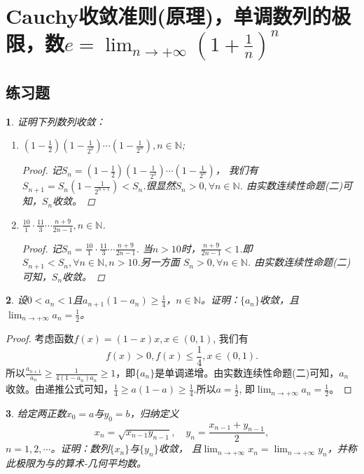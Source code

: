 \documentclass[utf8]{book}
\newtheorem{example}{}[section]             %
\begin{document}
\section{Cauchy收敛准则(原理)，单调数列的极限，数$e=\displaystyle \lim_{n\to +\infty}\left(1+\frac{1}{n}\right)^n$}
\subsection{练习题}
\begin{example}
证明下列数列收敛：
\renewcommand\labelenumi{\normalfont(\theenumi)}
\begin{enumerate}
\item $\displaystyle\left(1-\frac{1}{2}\right)\left(1-\frac{1}{2^2}\right)\cdots\left(1-\frac{1}{2^n}\right), n\in\mathbb{N}$;
\begin{proof}
记$S_n = \left(1-\frac{1}{2}\right)\left(1-\frac{1}{2^2}\right)\cdots\left(1-\frac{1}{2^n}\right)$， 我们有$S_{n+1} = S_n\left(1-\frac{1}{2^{n+1}}\right) < 
S_n$.很显然$S_n > 0,\forall n\in\mathbb{N}$. 由实数连续性命题(二)可知，$S_n$收敛。
\end{proof}

\item $\displaystyle\frac{10}{1}\cdot\frac{11}{3}\cdots\frac{n+9}{2n-1}, n\in\mathbb{N}$.
\begin{proof}
记$S_n = \displaystyle\frac{10}{1}\cdot\frac{11}{3}\cdots\frac{n+9}{2n-1}$. 当$n>10$时，$\frac{n+9}{2n-1} < 1$.即$S_{n+1} < S_{n},\forall n \in \mathbb{N}, n > 10$.另一方面
$S_n > 0, \forall n\in\mathbb{N}$. 由实数连续性命题(二)可知，$S_n$收敛。
\end{proof}
\end{enumerate}
\end{example}
\begin{example}
设$0<a_n<1$且$a_{n+1}(1-a_n)\geq \frac{1}{4}$，$n\in\mathbb{N}$。证明：$\{a_n\}$收敛，且$\displaystyle \lim_{n\to +\infty}a_n = \frac{1}{2}$。
\end{example}
\begin{proof}
考虑函数$f(x) = (1-x)x, x\in (0,1)$, 我们有$$f(x) > 0, f(x) \leq \frac{1}{4}, x\in (0,1).$$
所以$\displaystyle\frac{a_{n+1}}{a_n} \geq \frac{1}{4(1-a_n)a_n} \geq 1$，即$\{a_n\}$是单调递增。由实数连续性命题(二)可知，$a_n$收敛。由递推公式可知，$\frac{1}{4}\geq a(1-a)\geq \frac{1}{4}$.所以$a=\frac{1}{2}$, 即$\displaystyle \lim_{n\to +\infty}a_n = \frac{1}{2}$。
\end{proof}
\begin{example}
给定两正数$x_0=a$与$y_0=b$，归纳定义$$x_n=\sqrt{x_{n-1}y_{n-1}}, \quad y_n=\frac{x_{n-1}+y_{n-1}}{2},$$ $n=1,2,\cdots$。证明：数列$\{x_n\}$与$\{y_n\}$收敛，
且$\displaystyle \lim_{n\to +\infty}x_n=\displaystyle \lim_{n\to +\infty}y_n$，并称此极限为与的算术-几何平均数。
\end{example}
\end{document}
